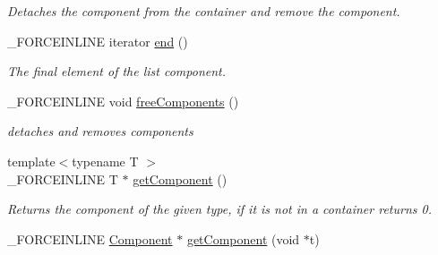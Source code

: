 \begin{DoxyCompactItemize}
\begin{DoxyCompactList}\small\item\em Detaches the component from the container and remove the component. \end{DoxyCompactList}\item 
\hypertarget{classcsad_1_1_container_components_ae2fe8ab5f1842629656b154f62e81aa2}{\-\_\-\-F\-O\-R\-C\-E\-I\-N\-L\-I\-N\-E iterator \hyperlink{classcsad_1_1_container_components_ae2fe8ab5f1842629656b154f62e81aa2}{end} ()}\label{classcsad_1_1_container_components_ae2fe8ab5f1842629656b154f62e81aa2}

\begin{DoxyCompactList}\small\item\em The final element of the list component. \end{DoxyCompactList}\item 
\hypertarget{classcsad_1_1_container_components_a404e7d34ff05cf693f42c868fc272888}{\-\_\-\-F\-O\-R\-C\-E\-I\-N\-L\-I\-N\-E void \hyperlink{classcsad_1_1_container_components_a404e7d34ff05cf693f42c868fc272888}{free\-Components} ()}\label{classcsad_1_1_container_components_a404e7d34ff05cf693f42c868fc272888}

\begin{DoxyCompactList}\small\item\em detaches and removes components \end{DoxyCompactList}\item 
\hypertarget{classcsad_1_1_container_components_a6ae49f1007bcf86debe62b4024674fae}{{\footnotesize template$<$typename T $>$ }\\\-\_\-\-F\-O\-R\-C\-E\-I\-N\-L\-I\-N\-E T $\ast$ \hyperlink{classcsad_1_1_container_components_a6ae49f1007bcf86debe62b4024674fae}{get\-Component} ()}\label{classcsad_1_1_container_components_a6ae49f1007bcf86debe62b4024674fae}

\begin{DoxyCompactList}\small\item\em Returns the component of the given type, if it is not in a container returns 0. \end{DoxyCompactList}\item 
\hypertarget{classcsad_1_1_container_components_a7c0d7faa832475d9f8e8349dd6389ee2}{\-\_\-\-F\-O\-R\-C\-E\-I\-N\-L\-I\-N\-E \hyperlink{classcsad_1_1_component}{Component} $\ast$ \hyperlink{classcsad_1_1_container_components_a7c0d7faa832475d9f8e8349dd6389ee2}{get\-Component} (void $\ast$t)}\label{classcsad_1_1_container_components_a7c0d7faa832475d9f8e8349dd6389ee2}


\end{DoxyCompactItemize}
